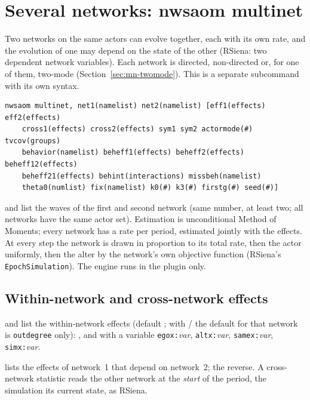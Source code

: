 \section{Several networks: nwsaom multinet}\label{sec:multinet}

Two networks on the same actors can evolve together, each with its own rate, and the evolution of one may depend on the state of the other (RSiena: two dependent network variables). Each network is directed, non-directed or, for one of them, two-mode (Section~\ref{sec:mn-twomode}). This is a separate subcommand with its own syntax.

\begin{lstlisting}
nwsaom multinet, net1(namelist) net2(namelist) [eff1(effects) eff2(effects)
    cross1(effects) cross2(effects) sym1 sym2 actormode(#) tvcov(groups)
    behavior(namelist) beheff1(effects) beheff2(effects) beheff12(effects)
    beheff21(effects) behint(interactions) missbeh(namelist)
    theta0(numlist) fix(namelist) k0(#) k3(#) firstg(#) seed(#)]
\end{lstlisting}

 and  list the waves of the first and second network (same number, at least two; all networks have the same actor set). Estimation is unconditional Method of Moments; every network has a rate per period, estimated jointly with the effects. At every step the network is drawn in proportion to its total rate, then the actor uniformly, then the alter by the network's own objective function (RSiena's \texttt{EpochSimulation}). The engine runs in the plugin only.

\subsection{Within-network and cross-network effects}

 and  list the within-network effects (default ; with / the default for that network is \texttt{outdegree} only): , and with a variable \texttt{egox:}\emph{var}, \texttt{altx:}\emph{var}, \texttt{samex:}\emph{var}, \texttt{simx:}\emph{var}.

 lists the effects of network~1 that depend on network~2;  the reverse. A cross-network statistic reads the other network at the \emph{start} of the period, the simulation its current state, as RSiena.

